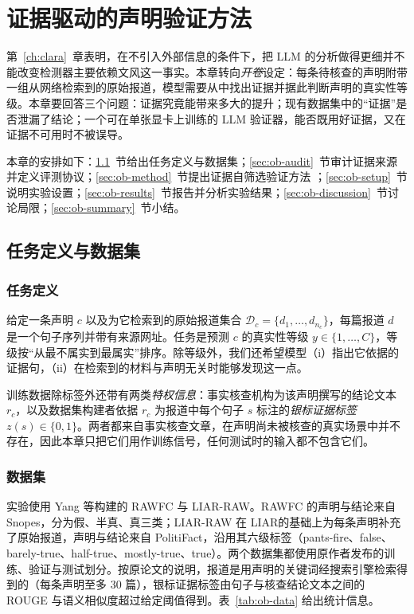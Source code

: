 \chapter{证据驱动的声明验证方法}\label{ch:openbook}

第~\ref{ch:clara}~章表明，在不引入外部信息的条件下，把 LLM 的分析做得更细并不能改变检测器主要依赖文风这一事实。本章转向\emph{开卷}设定：每条待核查的声明附带一组从网络检索到的原始报道，模型需要从中找出证据并据此判断声明的真实性等级。本章要回答三个问题：证据究竟能带来多大的提升；现有数据集中的“证据”是否泄漏了结论；一个可在单张显卡上训练的 LLM 验证器，能否既用好证据，又在证据不可用时不被误导。

本章的安排如下：\ref{sec:ob-task}~节给出任务定义与数据集；\ref{sec:ob-audit}~节审计证据来源并定义评测协议；\ref{sec:ob-method}~节提出证据自筛选验证方法 \ours{}；\ref{sec:ob-setup}~节说明实验设置；\ref{sec:ob-results}~节报告并分析实验结果；\ref{sec:ob-discussion}~节讨论局限；\ref{sec:ob-summary}~节小结。

\section{任务定义与数据集}\label{sec:ob-task}

\subsection{任务定义}

给定一条声明 $c$ 以及为它检索到的原始报道集合 $\mathcal D_c=\{d_1,\dots,d_{n_c}\}$，每篇报道 $d$ 是一个句子序列并带有来源网址。任务是预测 $c$ 的真实性等级 $y\in\{1,\dots,C\}$，等级按“从最不属实到最属实”排序。除等级外，我们还希望模型（i）指出它依据的证据句，（ii）在检索到的材料与声明无关时能够发现这一点。

训练数据除标签外还带有两类\emph{特权信息}：事实核查机构为该声明撰写的结论文本 $r_c$，以及数据集构建者依据 $r_c$ 为报道中每个句子 $s$ 标注的\emph{银标证据标签} $z(s)\in\{0,1\}$。两者都来自事实核查文章，在声明尚未被核查的真实场景中并不存在，因此本章只把它们用作训练信号，任何测试时的输入都不包含它们。

\subsection{数据集}

实验使用 Yang 等\citep{yang2022cofced}构建的 RAWFC 与 LIAR-RAW。RAWFC 的声明与结论来自 Snopes，分为假、半真、真三类；LIAR-RAW 在 LIAR\citep{wang2017liar}的基础上为每条声明补充了原始报道，声明与结论来自 PolitiFact，沿用其六级标签（pants-fire、false、barely-true、half-true、mostly-true、true）。两个数据集都使用原作者发布的训练、验证与测试划分。按原论文的说明，报道是用声明的关键词经搜索引擎检索得到的（每条声明至多 30 篇），银标证据标签由句子与核查结论文本之间的 ROUGE 与语义相似度超过给定阈值得到\citep{yang2022cofced}。表~\ref{tab:ob-data} 给出统计信息。

